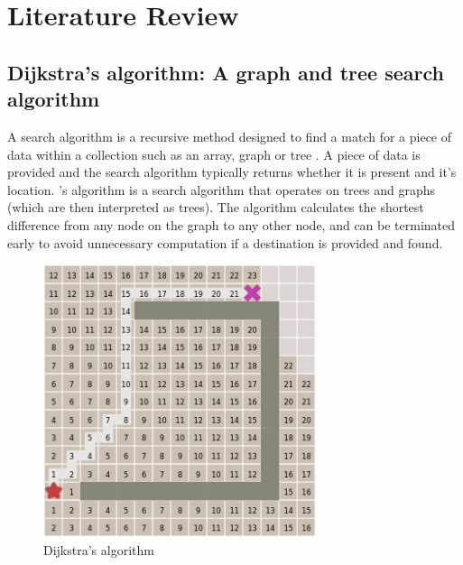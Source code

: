\documentclass[11pt, a4paper]{report}
\begin{document}
\section{Literature Review}
\label{sec:literatureReview}

\subsection{Dijkstra's algorithm: A graph and tree search algorithm}
\label{subsec:dijkstrasAlgorithm}

A search algorithm is a recursive method designed to find a match for a piece of data within a collection such as an array, graph or tree \parencite{friedman1976algorithm}. A piece of data is provided and the search algorithm typically returns whether it is present and it's location. \citeauthor{dijkstra1959note}'s algorithm \parencite*{dijkstra1959note} is a search algorithm that operates on trees and graphs (which are then interpreted as trees). The algorithm calculates the shortest difference from any node on the graph to any other node, and can be terminated early to avoid unnecessary computation if a destination is provided and found.

\begin{figure}[!h]
  \centering
  \includegraphics[width=8cm]{img/dijkstras_algorithm.png}
  \caption{Dijkstra's algorithm \parencite{red2014introduction}}
  \label{fig:dijkstrasAlgorithm}
\end{figure}
\end{document}
